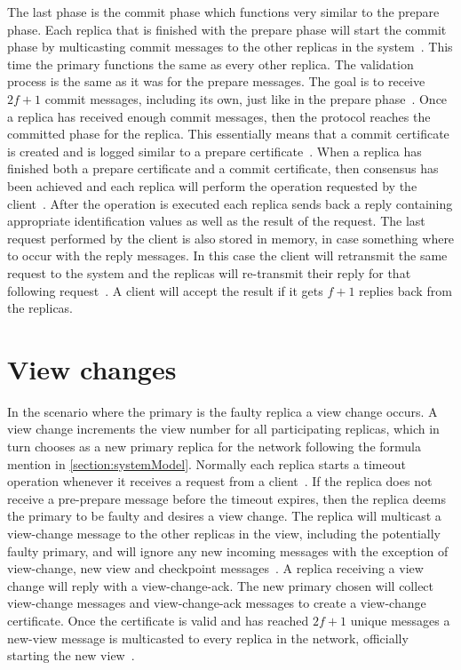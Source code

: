 The last phase is the commit phase which functions very similar to the prepare phase. Each replica that is finished with the prepare phase will start the commit phase by multicasting commit messages to the other replicas in the system~\cite[p.~4]{PAPER:OGPBFT}. This time the primary functions the same as every other replica. The validation process is the same as it was for the prepare messages. The goal is to receive $2f+1$ commit messages, including its own, just like in the prepare phase~\cite[p.~5]{PAPER:OGPBFT}. Once a replica has received enough commit messages, then the protocol reaches the committed phase for the replica. This essentially means that a commit certificate is created and is logged similar to a prepare certificate~\cites[p.~409]{PAPER:PBFTRecovery}[p.~457]{BOOK:MVstandver3}. When a replica has finished both a prepare certificate and a commit certificate, then consensus has been achieved and each replica will perform the operation requested by the client~\cites[p.~409]{PAPER:PBFTRecovery}[p.~5]{PAPER:OGPBFT}. After the operation is executed each replica sends back a reply containing appropriate identification values as well as the result of the request. The last request performed by the client is also stored in memory, in case something where to occur with the reply messages. In this case the client will retransmit the same request to the system and the replicas will re-transmit their reply for that following request~\cite[p.~409]{PAPER:PBFTRecovery}. A client will accept the result if it gets $f+1$ replies back from the replicas.

\section{View changes}
In the scenario where the primary is the faulty replica a view change occurs. A view change increments the view number for all participating replicas, which in turn chooses as a new primary replica for the network following the formula mention in \autoref{section:systemModel}. 
Normally each replica starts a timeout operation whenever it receives a request from a client~\cite[p.~415]{PAPER:PBFTRecovery}. 
If the replica does not receive a pre-prepare message before the timeout expires, then the replica deems the primary to be faulty and desires a view change. The replica will multicast a view-change message to the other replicas in the view, including the potentially faulty primary, and will ignore any new incoming messages with the exception of view-change, new view and checkpoint messages~\cites[p.~5-6]{PAPER:OGPBFT}[p.~263]{BOOK:BuildDepDistSyst}. 
A replica receiving a view change will reply with a view-change-ack.  The new primary chosen will collect view-change messages and view-change-ack messages to create a view-change certificate. Once the certificate is valid and has reached $2f+1$ unique messages a new-view message is multicasted to every replica in the network, officially starting the new view~\cites[p.~412-414]{PAPER:PBFTRecovery}[p.~263-p.265]{BOOK:BuildDepDistSyst}[p.~458]{BOOK:MVstandver3}.

